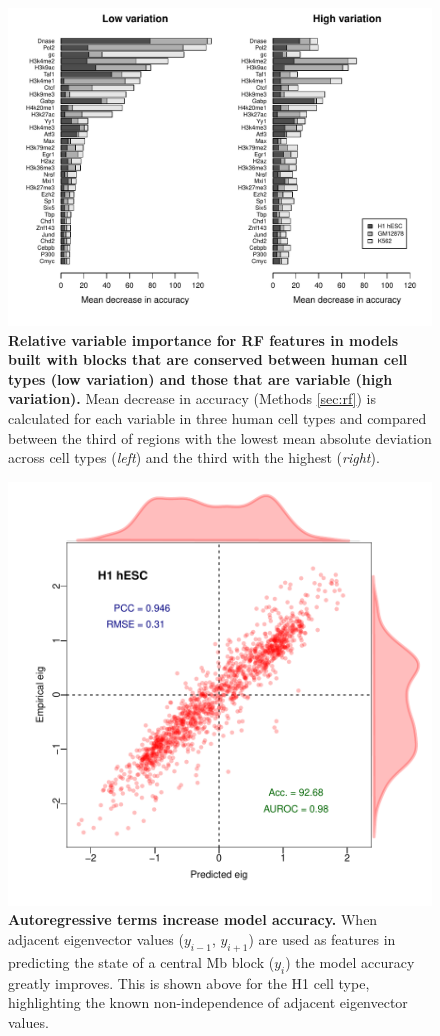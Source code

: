 \documentclass[a4paper]{report}
\begin{document}
\begin{figure}[H]
\begin{center}
\includegraphics[width=.8\textwidth]{figs/rfimp.pdf}
\captionsetup{width=\textwidth}
\caption{ {\bf Relative variable importance for RF features in models
    built with blocks that are conserved between human cell types (low
    variation) and those that are variable (high variation).} Mean
  decrease in accuracy (Methods \ref{sec:rf}) is calculated for each
  variable in three human cell types and compared between the
  third of regions with the lowest mean absolute deviation
  across cell types (\emph{left}) and the third with the
  highest (\emph{right}).
}\label{fig:rfimp}
\end{center}
\end{figure}

\begin{figure}[H]
\begin{center}
\includegraphics[width=.62\textwidth]{figs/s5.pdf}
\captionsetup{width=\textwidth}
\caption{ {\bf Autoregressive terms increase model accuracy.}  When
  adjacent eigenvector values ($y_{i-1}$, $y_{i+1}$) are used as
  features in predicting the state of a central Mb block ($y_i$) the
  model accuracy greatly improves. This is shown above for the H1 cell
  type, highlighting the known non-independence of adjacent eigenvector values. 
}\label{fig:areg}
\end{center} 
\end{figure} 
\end{document}
